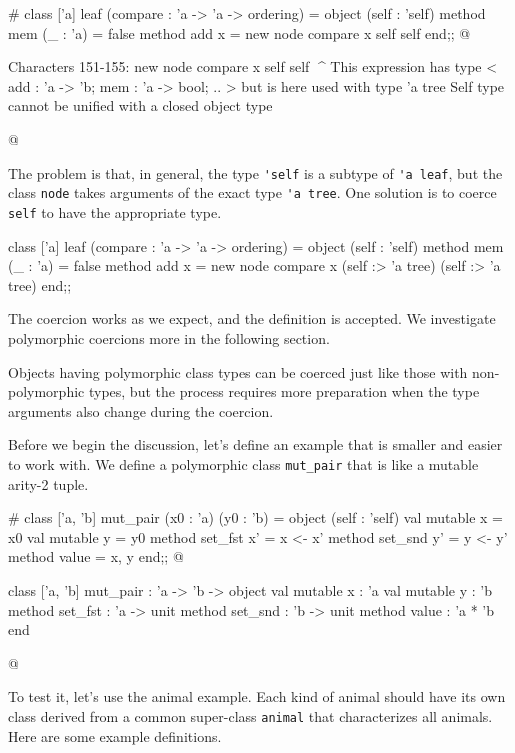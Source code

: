 \begin{ocaml}
# class ['a] leaf (compare : 'a -> 'a -> ordering) =
    object (self : 'self)
      method mem (_ : 'a) = false
      method add x = new node compare x self self
    end;;
@
\begin{toperror}
Characters 151-155:
        new node compare x self self
                           ^^^^
This expression has type < add : 'a -> 'b; mem : 'a -> bool; .. >
but is here used with type 'a tree
Self type cannot be unified with a closed object type
\end{toperror}
@
\end{ocaml}
%
The problem is that, in general, the type \hbox{\lstinline$'self$} is a
subtype of \hbox{\lstinline$'a leaf$}, but the class \hbox{\lstinline$node$} takes
arguments of the exact type \hbox{\lstinline$'a tree$}.  One solution is to
coerce \hbox{\lstinline$self$} to have the appropriate type.

\begin{ocaml}
class ['a] leaf (compare : 'a -> 'a -> ordering) =
  object (self : 'self)
    method mem (_ : 'a) = false
    method add x =
      new node compare x (self :> 'a tree) (self :> 'a tree)
  end;;
\end{ocaml}
%
The coercion works as we expect, and the definition is accepted.
We investigate polymorphic coercions more in the following section.


Objects having polymorphic class types can be coerced just like those
with non-polymorphic types, but the process requires more preparation
when the type arguments also change during the coercion.

Before we begin the discussion, let's define an example that is
smaller and easier to work with.  We define a polymorphic
class \hbox{\lstinline$mut_pair$} that is like a mutable arity-2 tuple.

\begin{ocaml}
# class ['a, 'b] mut_pair (x0 : 'a) (y0 : 'b) =
    object (self : 'self)
      val mutable x = x0
      val mutable y = y0
      method set_fst x' = x <- x'
      method set_snd y' = y <- y'
      method value = x, y
    end;;
@
\begin{topoutput}
class ['a, 'b] mut_pair : 'a -> 'b ->
  object
    val mutable x : 'a
    val mutable y : 'b
    method set_fst : 'a -> unit
    method set_snd : 'b -> unit
    method value : 'a * 'b
  end
\end{topoutput}
@
\end{ocaml}
%
To test it, let's use the animal example.
Each kind of animal should have its own class derived from a
common super-class \hbox{\lstinline$animal$} that characterizes all animals.
Here are some example definitions.

